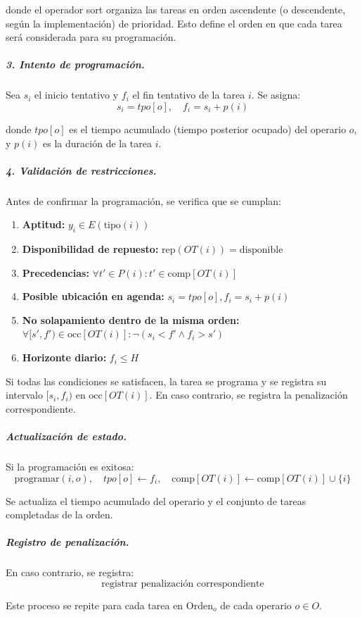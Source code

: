 donde el operador sort organiza las tareas en orden ascendente (o descendente, según la implementación) 
de prioridad. Esto define el orden en que cada tarea será considerada para su programación.

\subparagraph{3. Intento de programación.}
Sea $s_i$ el inicio tentativo y $f_i$ el fin tentativo de la tarea $i$. Se asigna:
\[
s_i = tpo[o], \quad f_i = s_i + p(i)
\]

donde $tpo[o]$ es el tiempo acumulado (tiempo posterior ocupado) del operario $o$, 
y $p(i)$ es la duración de la tarea $i$.

\subparagraph{4. Validación de restricciones.}
Antes de confirmar la programación, se verifica que se cumplan:

\begin{enumerate}
    \item \textbf{Aptitud:} $y_i \in E(\mathrm{tipo}(i))$ 
    \item \textbf{Disponibilidad de repuesto:} $\mathrm{rep}(OT(i)) = \text{disponible}$
    \item \textbf{Precedencias:} $\forall t' \in P(i) : t' \in \mathrm{comp}[OT(i)]$
    \item \textbf{Posible ubicación en agenda:} $s_i = tpo[o], f_i = s_i + p(i)$
    \item \textbf{No solapamiento dentro de la misma orden:}  
    $\forall [s', f') \in \mathrm{occ}[OT(i)] : \neg(s_i < f' \land f_i > s')$
    \item \textbf{Horizonte diario:} $f_i \leq H$
\end{enumerate}

Si todas las condiciones se satisfacen, la tarea se programa y se registra su intervalo $[s_i, f_i)$ 
en $\mathrm{occ}[OT(i)]$. En caso contrario, se registra la penalización correspondiente.

\subparagraph{Actualización de estado.}
Si la programación es exitosa:
\[
\mathrm{programar}(i, o), \quad tpo[o] \gets f_i, \quad \mathrm{comp}[OT(i)] \gets \mathrm{comp}[OT(i)] \cup \{i\}
\]

Se actualiza el tiempo acumulado del operario y el conjunto de tareas completadas de la orden.

\subparagraph{Registro de penalización.}
En caso contrario, se registra:
\[
\text{registrar penalización correspondiente}
\]

Este proceso se repite para cada tarea en $\mathrm{Orden}_o$ de cada operario $o \in O$.




